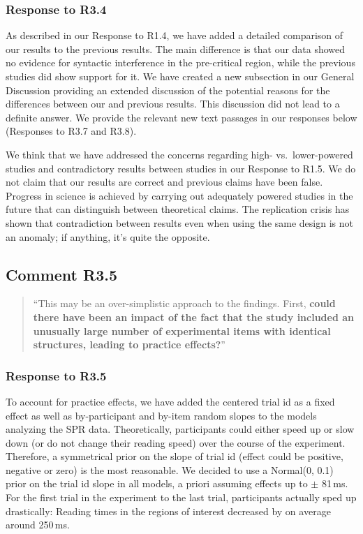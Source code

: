 \documentclass[12pt]{article}
\begin{document}
\subsubsection*{Response to R3.4}
As described in our Response to R1.4, we have added a detailed comparison of our results to the previous results. The main difference is that our data showed no evidence for syntactic interference in the pre-critical region, while the previous studies did show support for it. We have created a new subsection in our General Discussion providing an extended discussion of the potential reasons for the differences between our and previous results. This discussion did not lead to a definite answer. We provide the relevant new text passages in our responses below (Responses to R3.7 and R3.8).

We think that we have addressed the concerns regarding high- vs.\ lower-powered studies and contradictory results between studies in our Response to R1.5. We do not claim that our results are correct and previous claims have been false. Progress in science is achieved by carrying out adequately powered studies in the future that can
distinguish between theoretical claims. The replication crisis \citep{openscience2015_reproducibility} has shown that contradiction between results even when using the same design is not an anomaly; if anything, it's quite the opposite.

\subsection*{Comment R3.5}
\begin{quote}
``This may be an over-simplistic approach to the findings. First, \textbf{could there have been an impact of the fact that the study included an unusually large number of experimental items with identical structures, leading to practice effects?}''
\end{quote}

\subsubsection*{Response to R3.5}
To account for practice effects, we have added the centered trial id as a fixed effect as well as by-participant and by-item random slopes to the models analyzing the SPR data. Theoretically, participants could either speed up or slow down (or do not change their reading speed) over the course of the experiment. Therefore, a symmetrical prior on the slope of trial id (effect could be positive, negative or zero) is the most reasonable. We decided to use a Normal(0, 0.1) prior on the trial id slope in all models, a priori assuming effects up to $\pm$ 81\,ms. For the first trial in the experiment to the last trial, participants actually sped up drastically: Reading times in the regions of interest decreased by on average around 250\,ms. 
\end{document}

